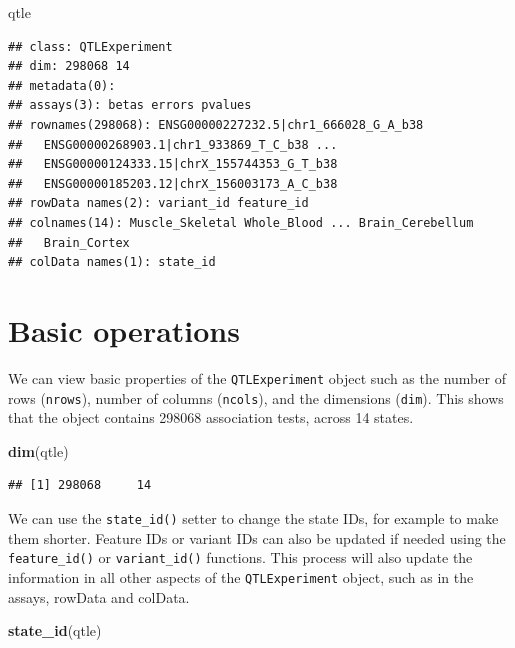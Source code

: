 \documentclass[
]{article}
\newenvironment{Shaded}{\begin{snugshade}}{\end{snugshade}}
\newcommand{\FunctionTok}[1]{\textcolor[rgb]{0.13,0.29,0.53}{\textbf{#1}}}
\newcommand{\NormalTok}[1]{#1}
\begin{document}
\begin{Shaded}
\begin{Highlighting}[]
\NormalTok{qtle}
\end{Highlighting}
\end{Shaded}

\begin{verbatim}
## class: QTLExperiment 
## dim: 298068 14 
## metadata(0):
## assays(3): betas errors pvalues
## rownames(298068): ENSG00000227232.5|chr1_666028_G_A_b38
##   ENSG00000268903.1|chr1_933869_T_C_b38 ...
##   ENSG00000124333.15|chrX_155744353_G_T_b38
##   ENSG00000185203.12|chrX_156003173_A_C_b38
## rowData names(2): variant_id feature_id
## colnames(14): Muscle_Skeletal Whole_Blood ... Brain_Cerebellum
##   Brain_Cortex
## colData names(1): state_id
\end{verbatim}

\normalsize

\section{Basic operations}\label{basic-operations}

We can view basic properties of the \texttt{QTLExperiment} object such
as the number of rows (\texttt{nrows}), number of columns
(\texttt{ncols}), and the dimensions (\texttt{dim}). This shows that the
object contains 298068 association tests, across 14 states.

\footnotesize

\begin{Shaded}
\begin{Highlighting}[]
\FunctionTok{dim}\NormalTok{(qtle)}
\end{Highlighting}
\end{Shaded}

\begin{verbatim}
## [1] 298068     14
\end{verbatim}

\normalsize

We can use the \texttt{state\_id()} setter to change the state IDs, for
example to make them shorter. Feature IDs or variant IDs can also be
updated if needed using the \texttt{feature\_id()} or
\texttt{variant\_id()} functions. This process will also update the
information in all other aspects of the \texttt{QTLExperiment} object,
such as in the assays, rowData and colData.

\footnotesize

\begin{Shaded}
\begin{Highlighting}[]
\FunctionTok{state\_id}\NormalTok{(qtle)}
\end{Highlighting}
\end{Shaded}
\end{document}
